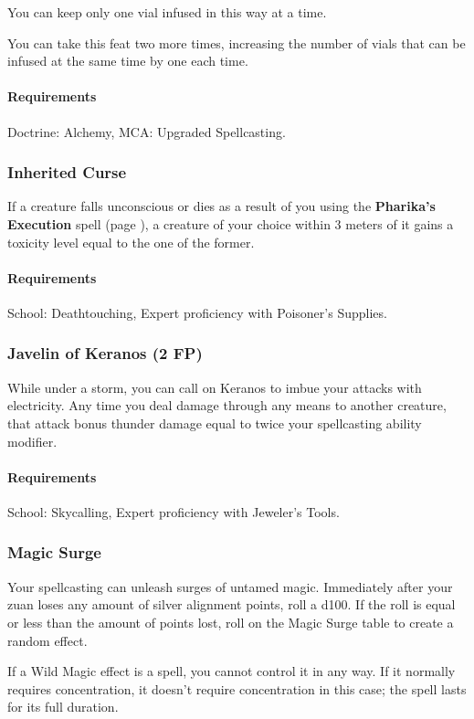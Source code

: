     You can keep only one vial infused in this way at a time.

    You can take this feat two more times, increasing the number of vials that can be infused at the same time by one each time.
    \paragraph{Requirements} Doctrine: Alchemy, MCA: Upgraded Spellcasting.
\subsubsection{Inherited Curse} \label{feat::inheritedcurse}
    If a creature falls unconscious or dies as a result of you using the \textbf{Pharika's Execution} spell (page \pageref{spell::pharikasexecution}), a creature of your choice within 3 meters of it gains a toxicity level equal to the one of the former.
    \paragraph{Requirements} School: Deathtouching, Expert proficiency with Poisoner's Supplies.
\subsubsection{Javelin of Keranos (2 FP)} \label{feat::javelinofkeranos}
    While under a storm, you can call on Keranos to imbue your attacks with electricity.
    Any time you deal damage through any means to another creature, that attack bonus thunder damage equal to twice your spellcasting ability modifier.
    \paragraph{Requirements} School: Skycalling, Expert proficiency with Jeweler's Tools.
\subsubsection{Magic Surge} \label{feat::magicsurge}
    Your spellcasting can unleash surges of untamed magic.
    Immediately after your zuan loses any amount of silver alignment points, roll a d100.
    If the roll is equal or less than the amount of points lost, roll on the Magic Surge table to create a random effect.

    If a Wild Magic effect is a spell, you cannot control it in any way.
    If it normally requires concentration, it doesn't require concentration in this case; the spell lasts for its full duration.

